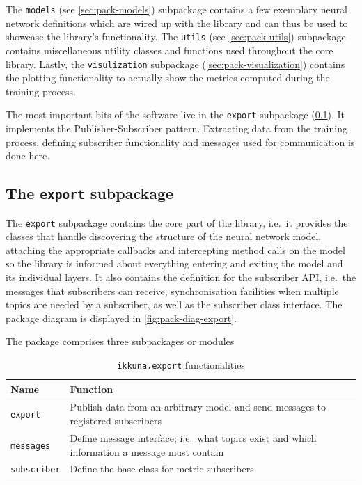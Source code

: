 The \texttt{models} (see \cref{sec:pack-models})
subpackage contains a few exemplary neural network definitions which are
wired up with the library and can thus be used to showcase the library's
functionality. The \texttt{utils} (see
\cref{sec:pack-utils}) subpackage contains miscellaneous utility classes
and functions used throughout the core library. Lastly, the
\texttt{visulization} subpackage
(\cref{sec:pack-visualization}) contains the plotting functionality to
actually show the metrics computed during the training process.

The most important bits of the software live in the
\texttt{export} subpackage (\cref{sec:pack-export}). It
implements the Publisher-Subscriber pattern. Extracting data from the
training process, defining subscriber functionality and messages used
for communication is done here.

\hypertarget{sec:pack-export}{%
\subsection{The \texttt{export} subpackage}\label{sec:pack-export}}

The \texttt{export} subpackage contains the core part
of the library, i.e.~it provides the classes that handle discovering the
structure of the neural network model, attaching the appropriate
callbacks and intercepting method calls on the model so the library is
informed about everything entering and exiting the model and its
individual layers. It also contains the definition for the subscriber
API, i.e.~the messages that subscribers can receive, synchronisation
facilities when multiple topics are needed by a subscriber, as well as
the subscriber class interface. The package diagram is displayed in
\cref{fig:pack-diag-export}.

The package comprises three subpackages or modules

\begin{table}
    \caption{\texttt{ikkuna.export} functionalities}
    \begin{tabularx}{\textwidth}{lX}
        \toprule
        Name                & Function\tabularnewline
        \midrule
        \texttt{export}     & Publish data from an arbitrary model and send messages to registered subscribers\tabularnewline
        \texttt{messages}   & Define message interface; i.e.~what topics exist and which information a message must contain\tabularnewline
        \texttt{subscriber} & Define the base class for metric
        subscribers\tabularnewline
        \bottomrule
    \end{tabularx}
\end{table}

